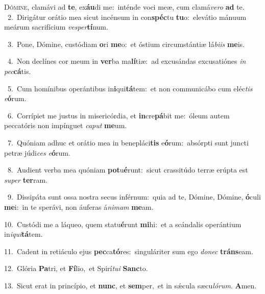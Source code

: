 \lettrine{\initial\textcolor{\initialcolor}{D}}{ómine,} clamávi ad \textbf{te}\-, ex\-\textbf{áu}\-di me:~\star inténde voci meæ, cum clamá\-\textit{ve}\-\textit{ro} \textbf{ad} te.\\
{\numbfont\textcolor{\numbcolor}{~2.}}~Dirigátur orátio mea sicut incénsum in con\-\textbf{spéc}\-tu \textbf{tu}\-o:~\star elevátio mánuum meárum sacrifícium \textit{ves}\-\textit{per}\textbf{tí}num.\par
{\numbfont\textcolor{\numbcolor}{~3.}}~Pone, Dómine, custódiam \textbf{o}\-ri \textbf{me}\-o:~\star et óstium circumstántiæ lá\-\textit{bi}\-\textit{is} \textbf{me}\-is.\par
{\numbfont\textcolor{\numbcolor}{~4.}}~Non declínes cor meum in \textbf{ver}\-ba ma\-\textbf{lí}\-tiæ:~\star ad excusándas excusatiónes \textit{in} \textit{pec}\-\textbf{cá}tis.\par
{\numbfont\textcolor{\numbcolor}{~5.}}~Cum homínibus operántibus in\-\textbf{i}\-qui\-\textbf{tá}\-tem:~\star et non communicábo cum eléc\textit{tis} \textit{e}\-\textbf{ó}rum.\par
{\numbfont\textcolor{\numbcolor}{~6.}}~Corrípiet me justus in misericórdia, et \textbf{in}\-cre\-\textbf{pá}\-bit me:~\star óleum autem peccatóris non impínguet \textit{ca}\-\textit{put} \textbf{me}\-um.\par
{\numbfont\textcolor{\numbcolor}{~7.}}~Quóniam adhuc et orátio mea in benepláci\textbf{tis} e\-\textbf{ó}\-rum:~\star absórpti sunt juncti petræ júdi\textit{ces} \textit{e}\-\textbf{ó}rum.\par
{\numbfont\textcolor{\numbcolor}{~8.}}~Audient verba mea quóniam \textbf{pot}\-u\-\textbf{é}\-runt:~\star sicut crassitúdo terræ erúpta est \textit{su}\-\textit{per} \textbf{ter}\-ram.\par
{\numbfont\textcolor{\numbcolor}{~9.}}~Dissipáta sunt ossa nostra secus inférnum:~\dagger quia ad te, Dómine, Dómine, \textbf{ó}\-culi \textbf{me}\-i:~\star in te sperávi, non áuferas á\-\textit{ni}\-\textit{mam} \textbf{me}\-am.\par
{\numbfont\textcolor{\numbcolor}{10.}}~Custódi me a láqueo, quem statu\-\textbf{é}\-runt \textbf{mi}\-hi:~\star et a scándalis operántium in\-\textit{i}\-\textit{qui}\textbf{tá}tem.\par
{\numbfont\textcolor{\numbcolor}{11.}}~Cadent in retiáculo ejus \textbf{pec}\-ca\-\textbf{tó}\-res:~\star singuláriter sum ego \textit{do}\-\textit{nec} \textbf{tráns}\-eam.\par
{\numbfont\textcolor{\numbcolor}{12.}}~Glória \textbf{Pa}\-tri, et \textbf{Fí}\-lio,~\star et Spirí\-\textit{tu}\-\textit{i} \textbf{Sanc}\-to.\par
{\numbfont\textcolor{\numbcolor}{13.}}~Sicut erat in princípio, et \textbf{nunc}\-, et \textbf{sem}\-per,~\star et in sǽcula sæcu\-\textit{ló}\-\textit{rum}. \textbf{A}\-men.\par
